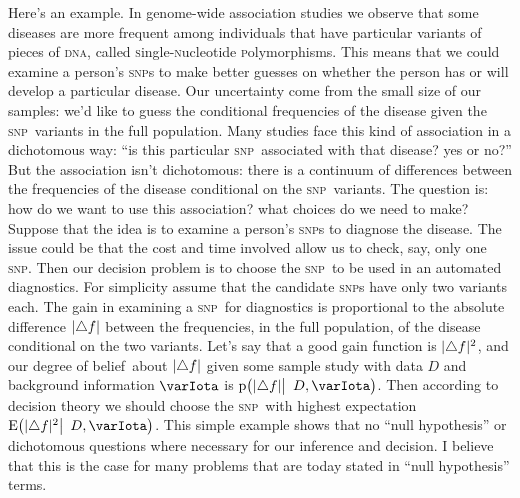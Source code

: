 \documentclass[\ifafour a4paper,12pt,\else a5paper,10pt,\fi%
onecolumn,oneside,article,%
british%
]{memoir}
\theoremstyle{remark}
\theoremstyle{innote}
\newcommand*{\incr}{\triangle}%
\DeclarePairedDelimiter\abs{\lvert}{\rvert}
\newcommand*{\pf}{\mathrm{p}}%
\renewcommand*{\|}{\mathpunct{|}}
\newcommand*{\lcond}[1][]{\mathpunct{#1|\ }}%
\newcommand*{\E}{\mathrm{E}}
\DeclarePairedDelimiter\expp{(}{)}
\newcommand*{\expe}{\E\expp}%
\newcommand*{\dob}{degree of belief}
\newcommand*{\yI}{\varIota}
\newcommand*{\yD}{D}
\newcommand*{\snp}{\textsc{snp}}
\begin{document}
Here's an example. In genome-wide association studies we observe that some
diseases are more frequent among individuals that have particular variants
of pieces of \textsc{dna}, called \textsc{s}ingle-\textsc{n}ucleotide
\textsc{p}olymorphisms. This means that we could examine a person's \snp s
to make better guesses on whether the person has or will develop a
particular disease. Our uncertainty come from the small size of our
samples: we'd like to guess the conditional frequencies of the disease
given the \snp\ variants in the full population. Many studies face this
kind of association in a dichotomous way: \enquote{is this particular \snp\
  associated with that disease? yes or no?} But the association isn't
dichotomous: there is a continuum of differences between the frequencies of
the disease conditional on the \snp\ variants. The question is: how do we
want to use this association? what choices do we need to make? Suppose that
the idea is to examine a person's \snp s to diagnose the disease. The issue
could be that the cost and time involved allow us to check, say, only one
\snp. Then our decision problem is to choose the \snp\ to be used in an
automated diagnostics. For simplicity assume that the candidate \snp s have
only two variants each. The gain in examining a \snp\ for diagnostics is
proportional to the absolute difference $\abs{\incr f}$ between the
frequencies, in the full population, of the disease conditional on the two
variants. Let's say that a good gain function is $\abs{\incr f}^2$, and our
\dob\ about $\abs{\incr f}$ given some sample study with data $\yD$ and
background information $\yI$ is
$\pf\bigl(\abs{\incr f} \lcond[\big] \yD, \yI\bigr)$. Then according to
decision theory we should choose the \snp\ with highest expectation
$\expe[\big]{\abs{\incr f}^2 \lcond[\big] \yD, \yI}$. This simple example
shows that no \enquote{null hypothesis} or dichotomous questions where
necessary for our inference and decision. I believe that this is the case
for many problems that are today stated in \enquote{null hypothesis} terms.
\end{document}
